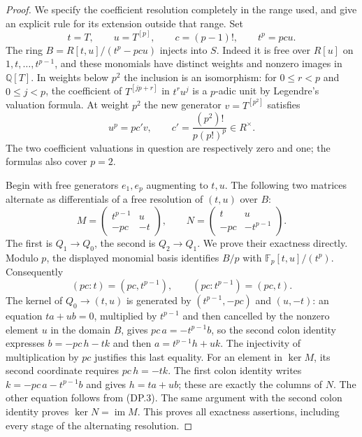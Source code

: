 \begin{proof}
We specify the coefficient resolution completely in the
range used, and give an explicit rule for its extension
outside that range. Set
\[
 t=T,\qquad u=T^{[p]},\qquad c=(p-1)!,\qquad t^p=pcu.
 \tag{DP.3}
\]
The ring $B=R[t,u]/(t^p-pcu)$ injects into $S$.
Indeed it is free over $R[u]$ on $1,t,\ldots,t^{p-1}$,
and these monomials have distinct weights and nonzero
images in $\mathbb Q[T]$.
In weights below $p^2$ the inclusion is an isomorphism:
for $0\leq r<p$ and $0\leq j<p$, the coefficient of
$T^{[jp+r]}$ in $t^ru^j$ is a $p$-adic unit by Legendre's
valuation formula. At weight $p^2$ the new generator
$v=T^{[p^2]}$ satisfies
\[
 u^p=pc'v,\qquad
 c'=\frac{(p^2)!}{p(p!)^p}\in R^\times .            \tag{DP.4}
\]
The two coefficient valuations in question are respectively
zero and one; the formulas also cover $p=2$.

Begin with free generators $e_1,e_p$ augmenting to $t,u$.
The following two matrices alternate as differentials
of a free resolution of $(t,u)$ over $B$:
\[
 M=\begin{pmatrix}t^{p-1}&u\\-pc&-t\end{pmatrix},
 \qquad
 N=\begin{pmatrix}t&u\\-pc&-t^{p-1}\end{pmatrix}.
 \tag{DP.5}
\]
The first is $Q_1\to Q_0$, the second is $Q_2\to Q_1$.
We prove their exactness directly. Modulo $p$, the displayed
monomial basis identifies $B/p$ with
$\mathbb F_p[t,u]/(t^p)$. Consequently
\[
 (pc:t)=(pc,t^{p-1}),\qquad
 (pc:t^{p-1})=(pc,t).                              \tag{DP.6}
\]
The kernel of $Q_0\to(t,u)$ is generated by
$(t^{p-1},-pc)$ and $(u,-t)$: an equation
$ta+ub=0$, multiplied by $t^{p-1}$ and then cancelled
by the nonzero element $u$ in the domain $B$, gives
$pc\,a=-t^{p-1}b$, so the second
colon identity expresses $b=-pc\,h-tk$ and then
$a=t^{p-1}h+uk$. The injectivity of multiplication by
$pc$ justifies this last equality.
For an element in $\ker M$, its second coordinate
requires $pc\,h=-tk$. The first colon identity writes
$k=-pc\,a-t^{p-1}b$ and gives $h=ta+ub$; these are
exactly the columns of $N$. The other equation follows
from (DP.3). The same argument with the second colon
identity proves $\ker N=\operatorname{im}M$.
This proves all exactness assertions, including every
stage of the alternating resolution.


\end{proof}
